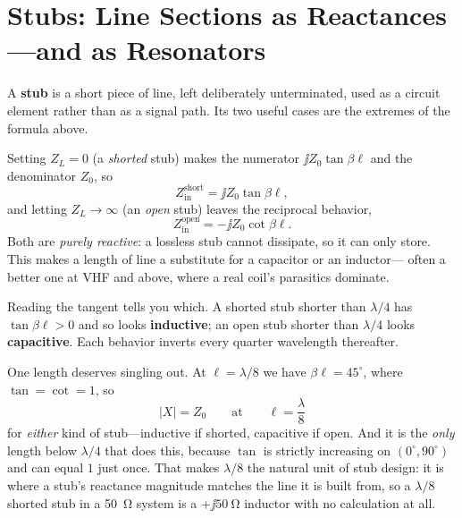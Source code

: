 \section{Stubs: Line Sections as Reactances---and as Resonators}
\label{sec:stubs}
A \textbf{stub} is a short piece of line, left deliberately unterminated, used as a
circuit element rather than as a signal path. Its two useful cases are the extremes
of the formula above.

Setting \(Z_L=0\) (a \emph{shorted} stub) makes the numerator \(\jj Z_0\tan\beta\ell\)
and the denominator \(Z_0\), so
\[
Z_{\mathrm{in}}^{\text{short}}=\jj Z_0\tan\beta\ell ,
\]
and letting \(Z_L\to\infty\) (an \emph{open} stub) leaves the reciprocal behavior,
\[
Z_{\mathrm{in}}^{\text{open}}=-\jj Z_0\cot\beta\ell .
\]
Both are \emph{purely reactive}: a lossless stub cannot dissipate, so it can only
store. This makes a length of line a substitute for a capacitor or an inductor---
often a better one at VHF and above, where a real coil's parasitics dominate.

Reading the tangent tells you which. A shorted stub shorter than \(\lambda/4\) has
\(\tan\beta\ell>0\) and so looks \textbf{inductive}; an open stub shorter than
\(\lambda/4\) looks \textbf{capacitive}. Each behavior inverts every quarter
wavelength thereafter.

One length deserves singling out. At \(\ell=\lambda/8\) we have
\(\beta\ell=45^\circ\), where \(\tan=\cot=1\), so
\[
|X|=Z_0
\qquad\text{at}\qquad
\ell=\frac{\lambda}{8}
\]
for \emph{either} kind of stub---inductive if shorted, capacitive if open. And it is
the \emph{only} length below \(\lambda/4\) that does this, because \(\tan\) is
strictly increasing on \((0^\circ,90^\circ)\) and can equal \(1\) just once. That
makes \(\lambda/8\) the natural unit of stub design: it is where a stub's reactance
magnitude matches the line it is built from, so a \(\lambda/8\) shorted stub in a
\SI{50}{\ohm} system is a \(+\jj\SI{50}{\ohm}\) inductor with no calculation at all.


